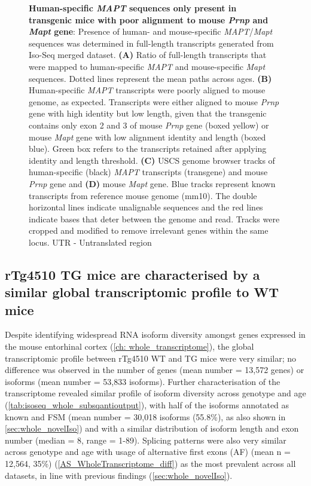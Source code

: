 \begin{figure}[htp]
	{\textbf{Human-specific \textit{MAPT} sequences only present in transgenic mice with poor alignment to mouse \textit{Prnp} and \textit{Mapt} gene}: Presence of human- and mouse-specific \textit{MAPT}/\textit{Mapt} sequences was determined in full-length transcripts generated from Iso-Seq merged dataset. \textbf{(A)} Ratio of full-length transcripts that were mapped to human-specific \textit{MAPT} and mouse-specific \textit{Mapt} sequences. Dotted lines represent the mean paths across ages. \textbf{(B)} Human-specific \textit{MAPT} transcripts were poorly aligned to mouse genome, as expected. Transcripts were either aligned to mouse \textit{Prnp} gene with high identity but low length, given that the transgenic contains only exon 2 and 3 of mouse \textit{Prnp} gene\cite{Ramsden2005} (boxed yellow) or  mouse \textit{Mapt} gene with low alignment identity and length (boxed blue). Green box refers to the transcripts retained after applying identity and length threshold. \textbf{(C)} USCS genome browser tracks of human-specific (black) \textit{MAPT} transcripts (transgene) and mouse \textit{Prnp} gene and \textbf{(D)} mouse \textit{Mapt} gene. Blue tracks represent known transcripts from reference mouse genome (mm10). The double horizontal lines indicate unalignable sequences and the red lines indicate bases that deter between the genome and read. Tracks were cropped and modified to remove irrelevant genes within the same locus.  UTR - Untranslated region}
	\label{fig:isoseq_humanmapt}
\end{figure}

\clearpage
\subsection{rTg4510 TG mice are characterised by a similar global transcriptomic profile to WT mice}
Despite identifying widespread RNA isoform diversity amongst genes expressed in the mouse entorhinal cortex (\cref{ch: whole_transcriptome}), the global transcriptomic profile between rTg4510 WT and TG mice were very similar; no difference was observed in the number of genes (mean number = 13,572 genes) or isoforms (mean number = 53,833 isoforms). Further characterisation of the transcriptome revealed similar profile of isoform diversity across genotype and age (\cref{tab:isoseq_whole_subsqantioutput}), with half of the isoforms annotated as known and FSM (mean number = 30,018 isoforms (55.8\%), as also shown in \cref{sec:whole_novelIso}) and with a similar distribution of isoform length and exon number (median = 8, range = 1-89). Splicing patterns were also very similar across genotype and age with usage of alternative first exons (AF) (mean n = 12,564, 35\%) (\cref{AS_WholeTranscriptome_diff}) as the most prevalent across all datasets, in line with previous findings (\cref{sec:whole_novelIso}).

